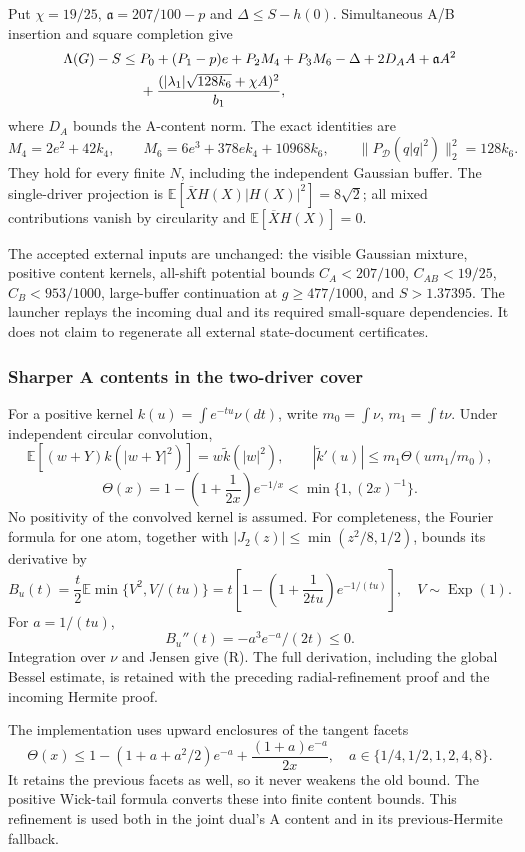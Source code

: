 Put $\chi=19/25$, $\mathfrak a=207/100-p$ and
$\Delta\le S-h(0)$. Simultaneous A/B insertion and square completion give
\begin{align}
 \Lambda(G)-S\le{}&
 P_0+(P_1-p)e+P_2M_4+P_3M_6-\Delta
       +2D_AA+\mathfrak a A^2 \notag\\
 &+\frac{(|\lambda_1|\sqrt{128k_6}+\chi A)^2}{b_1},
 \label{eq:k-joint-master}
\end{align}
where $D_A$ bounds the A-content norm. The exact identities are
\[
 M_4=2e^2+42k_4,\qquad
 M_6=6e^3+378ek_4+10968k_6,\qquad
 \|P_{\mathcal D}(q|q|^2)\|_2^2=128k_6.
\]
They hold for every finite $N$, including the independent Gaussian
buffer. The single-driver projection is
$\mathbb E[\overline XH(X)|H(X)|^2]=8\sqrt2$; all mixed contributions
vanish by circularity and $\mathbb E[\overline XH(X)]=0$.

The accepted external inputs are unchanged: the visible Gaussian
mixture, positive content kernels, all-shift potential bounds
$C_A<207/100$, $C_{AB}<19/25$, $C_B<953/1000$, large-buffer continuation
at $g\ge477/1000$, and $S>1.37395$. The launcher replays the incoming
dual and its required small-square dependencies. It does not claim to
regenerate all external state-document certificates.

\subsubsection{Sharper A contents in the two-driver cover}
For a positive kernel $k(u)=\int e^{-tu}\nu(dt)$, write
$m_0=\int\nu$, $m_1=\int t\nu$. Under independent circular convolution,
\[
 \mathbb E[(w+Y)k(|w+Y|^2)]=w\widetilde k(|w|^2),\qquad
 |\widetilde k'(u)|\le
 m_1\Theta(um_1/m_0),
\]
\[
 \Theta(x)=1-\left(1+\frac1{2x}\right)e^{-1/x}
             <\min\{1,(2x)^{-1}\}.
 \tag{R}
\]
No positivity of the convolved kernel is assumed.
For completeness, the Fourier formula for one atom, together with
$|J_2(z)|\le\min(z^2/8,1/2)$, bounds its derivative by
\[
 B_u(t)=\frac t2\mathbb E\min\{V^2,V/(tu)\}
       =t\left[1-\left(1+\frac1{2tu}\right)e^{-1/(tu)}\right],
 \quad V\sim\operatorname{Exp}(1).
\]
For $a=1/(tu)$,
\[
 B_u''(t)=-a^3e^{-a}/(2t)\le0.
\]
Integration over $\nu$ and Jensen give (R). The full derivation,
including the global Bessel estimate, is retained with the preceding
radial-refinement proof and the incoming Hermite proof.

The implementation uses upward enclosures of the tangent facets
\[
 \Theta(x)\le
 1-(1+a+a^2/2)e^{-a}+\frac{(1+a)e^{-a}}{2x},
 \quad a\in\{1/4,1/2,1,2,4,8\}.
\]
It retains the previous facets as well, so it never weakens the old
bound. The positive Wick-tail formula converts these into finite
content bounds. This refinement is used both in the joint dual's
A content and in its previous-Hermite fallback.

